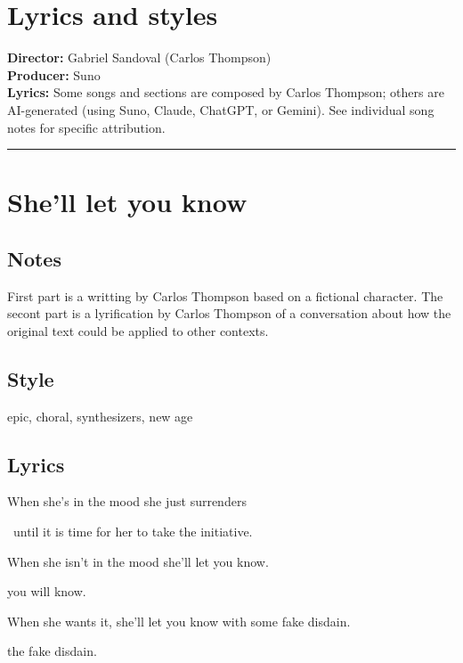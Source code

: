 \section{Lyrics and styles}\label{lyrics-and-styles}

\textbf{Director:} Gabriel Sandoval (Carlos Thompson)\\
\textbf{Producer:} Suno\\
\textbf{Lyrics:} Some songs and sections are composed by Carlos
Thompson; others are AI-generated (using Suno, Claude, ChatGPT, or
Gemini). See individual song notes for specific attribution.

\begin{center}\rule{0.5\linewidth}{0.5pt}\end{center}

\section{She'll let you know}\label{shell-let-you-know}

\subsection{Notes}\label{notes}

First part is a writting by Carlos Thompson based on a fictional
character. The secont part is a lyrification by Carlos Thompson of a
conversation about how the original text could be applied to other
contexts.

\subsection{Style}\label{style}

epic, choral, synthesizers, new age

\subsection{Lyrics}\label{lyrics}

When she's in the mood she just surrenders\\
\strut ~until it is time for her to take the initiative.

When she isn't in the mood she'll let you know.

you will know.

When she wants it, she'll let you know with some fake disdain.

the fake disdain.

